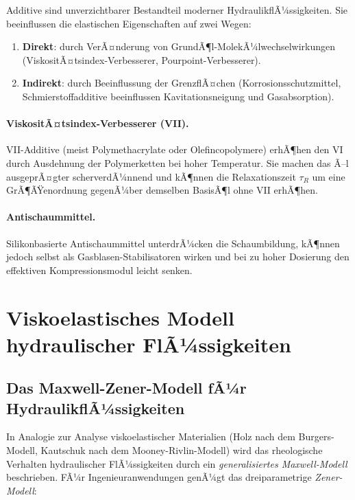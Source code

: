 ﻿\documentclass[a4paper,12pt]{scrreprt}
\theoremstyle{definition}
\begin{document}
Additive sind unverzichtbarer Bestandteil moderner HydraulikflÃ¼ssigkeiten.
Sie beeinflussen die elastischen Eigenschaften auf zwei Wegen:

\begin{enumerate}
  \item \textbf{Direkt}: durch VerÃ¤nderung von GrundÃ¶l-MolekÃ¼lwechselwirkungen
    (ViskositÃ¤tsindex-Verbesserer, Pourpoint-Verbesserer).
  \item \textbf{Indirekt}: durch Beeinflussung der GrenzflÃ¤chen
    (Korrosionsschutzmittel, Schmierstoffadditive beeinflussen Kavitationsneigung
    und Gasabsorption).
\end{enumerate}

\paragraph{ViskositÃ¤tsindex-Verbesserer (VII).}
VII-Additive (meist Polymethacrylate oder Olefincopolymere) erhÃ¶hen den VI
durch Ausdehnung der Polymerketten bei hoher Temperatur. Sie machen das Ã–l
ausgeprÃ¤gter scherverdÃ¼nnend und kÃ¶nnen die Relaxationszeit $\tau_R$
um eine GrÃ¶ÃŸenordnung gegenÃ¼ber demselben BasisÃ¶l ohne VII erhÃ¶hen.

\paragraph{Antischaummittel.}
Silikonbasierte Antischaummittel unterdrÃ¼cken die Schaumbildung, kÃ¶nnen
jedoch selbst als Gasblasen-Stabilisatoren wirken und bei zu hoher
Dosierung den effektiven Kompressionsmodul leicht senken.

\section{Viskoelastisches Modell hydraulischer FlÃ¼ssigkeiten}

\subsection{Das Maxwell-Zener-Modell fÃ¼r HydraulikflÃ¼ssigkeiten}

In Analogie zur Analyse viskoelastischer Materialien (Holz nach dem
Burgers-Modell, Kautschuk nach dem Mooney-Rivlin-Modell) wird das
rheologische Verhalten hydraulischer FlÃ¼ssigkeiten durch ein
\emph{generalisiertes Maxwell-Modell} beschrieben. FÃ¼r
Ingenieuranwendungen genÃ¼gt das dreiparametrige \emph{Zener-Modell}:
\end{document}
